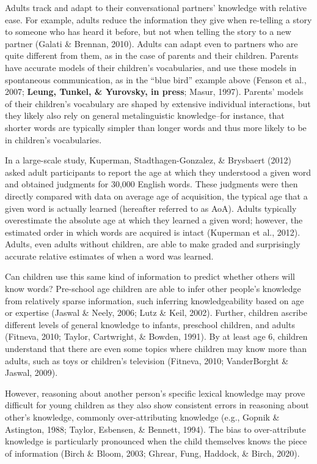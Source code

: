 \documentclass[10pt, letterpaper]{article}
\begin{document}
Adults track and adapt to their conversational partners' knowledge with
relative ease. For example, adults reduce the information they give when
re-telling a story to someone who has heard it before, but not when
telling the story to a new partner (Galati \& Brennan, 2010). Adults can
adapt even to partners who are quite different from them, as in the case
of parents and their children. Parents have accurate models of their
children's vocabularies, and use these models in spontaneous
communication, as in the ``blue bird'' example above (Fenson et al.,
2007; \textbf{Leung, Tunkel, \& Yurovsky, in press}; Masur, 1997).
Parents' models of their children's vocabulary are shaped by extensive
individual interactions, but they likely also rely on general
metalinguistic knowledge--for instance, that shorter words are typically
simpler than longer words and thus more likely to be in children's
vocabularies.

In a large-scale study, Kuperman, Stadthagen-Gonzalez, \& Brysbaert
(2012) asked adult participants to report the age at which they
understood a given word and obtained judgments for 30,000 English words.
These judgments were then directly compared with data on average age of
acquisition, the typical age that a given word is actually learned
(hereafter referred to as AoA). Adults typically overestimate the
absolute age at which they learned a given word; however, the estimated
order in which words are acquired is intact (Kuperman et al., 2012).
Adults, even adults without children, are able to make graded and
surprisingly accurate relative estimates of when a word was learned.

Can children use this same kind of information to predict whether others
will know words? Pre-school age children are able to infer other
people's knowledge from relatively sparse information, such inferring
knowledgeability based on age or expertise (Jaswal \& Neely, 2006; Lutz
\& Keil, 2002). Further, children ascribe different levels of general
knowledge to infants, preschool children, and adults (Fitneva, 2010;
Taylor, Cartwright, \& Bowden, 1991). By at least age 6, children
understand that there are even some topics where children may know more
than adults, such as toys or children's television (Fitneva, 2010;
VanderBorght \& Jaswal, 2009).

However, reasoning about another person's specific lexical knowledge may
prove difficult for young children as they also show consistent errors
in reasoning about other's knowledge, commonly over-attributing
knowledge (e.g., Gopnik \& Astington, 1988; Taylor, Esbensen, \&
Bennett, 1994). The bias to over-attribute knowledge is particularly
pronounced when the child themselves knows the piece of information
(Birch \& Bloom, 2003; Ghrear, Fung, Haddock, \& Birch, 2020).
\end{document}
